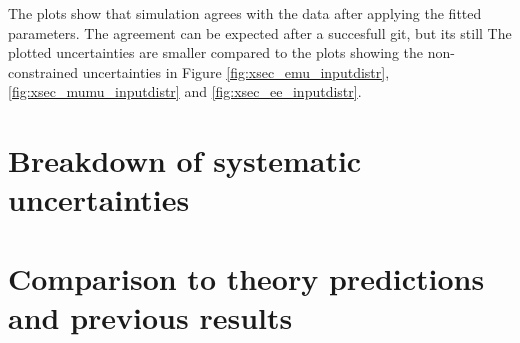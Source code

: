 The plots show that simulation agrees with the data after applying the fitted parameters.
The agreement can be expected after a succesfull git, but its still
The plotted uncertainties are smaller compared to the plots showing the non-constrained uncertainties in Figure \ref{fig:xsec_emu_inputdistr},\ref{fig:xsec_mumu_inputdistr} and \ref{fig:xsec_ee_inputdistr}.


\section{Breakdown of systematic uncertainties}
\label{sec:results_uncert}


\section{Comparison to theory predictions and previous results}
\label{results_comp}